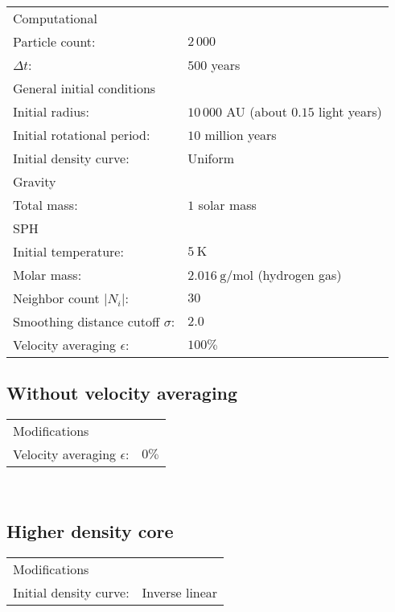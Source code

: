 \documentclass[../main.tex]{subfiles}
\begin{document}
\begin{tabular}{ll}

\multicolumn{2}{l}{Computational} \\
    \qquad Particle count:                     & $2 \, 000$ \\
    \qquad $\Delta t$:                         & $500$ years \\
\multicolumn{2}{l}{General initial conditions} \\
    \qquad Initial radius:                     & $10 \, 000$ AU (about $0.15$ light years)\\
    \qquad Initial rotational period:          & $10$ million years \\
    \qquad Initial density curve:              & Uniform \\
\multicolumn{2}{l}{Gravity} \\
    \qquad Total mass:                         & $1$ solar mass \\
\multicolumn{2}{l}{SPH} \\
    \qquad Initial temperature:                & $\SI{5}{\kelvin}$ \\
    \qquad Molar mass:                         & $\SI{2.016}{\gram\per\mole}$ (hydrogen gas) \\
    \qquad Neighbor count $|N_i|$:             & $30$ \\
    \qquad Smoothing distance cutoff $\sigma$:        & $2.0$ \\
    \qquad Velocity averaging $\epsilon$:      & $100\%$ \\

\end{tabular}

\subsection{Without velocity averaging}
\begin{tabular}{ll}
\multicolumn{2}{l}{Modifications} \\
    \qquad Velocity averaging $\epsilon$:      & $0\%$ \\
\end{tabular}
\\

\subsection{Higher density core}

\begin{tabular}{ll}
\multicolumn{2}{l}{Modifications} \\
    \qquad Initial density curve:              & Inverse linear \\
\end{tabular}
\\
\end{document}
